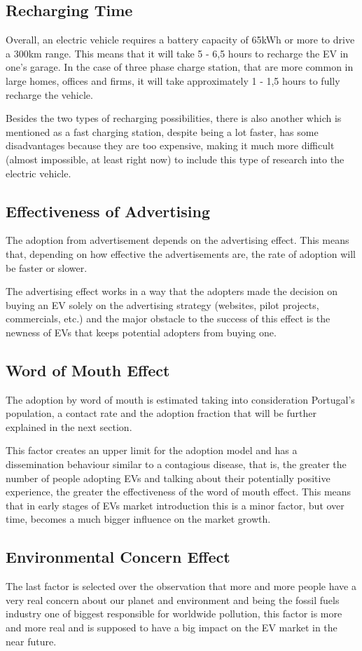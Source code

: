 \subsection{Recharging Time}
Overall, an electric vehicle requires a battery capacity of 65kWh or more to drive a 300km range. This means that it will take 5 - 6,5 hours to recharge the EV in one's garage. In the case of three phase charge station, that are more common in large homes, offices and firms, it will take approximately 1 - 1,5 hours to fully recharge the vehicle.

Besides the two types of recharging possibilities, there is also another which is mentioned as a fast charging station, despite being a lot faster, has some disadvantages because they are too expensive, making it much more difficult (almost impossible, at least right now) to include this type of research into the electric vehicle.

\subsection{Effectiveness of Advertising}
The adoption from advertisement depends on the advertising effect. This means that, depending on how effective the advertisements are, the rate of adoption will be faster or slower.

The advertising effect works in a way that the adopters made the decision on buying an EV solely on the advertising strategy (websites, pilot projects, commercials, etc.) and the major obstacle to the success of this effect is the newness of EVs that keeps potential adopters from buying one.

\subsection{Word of Mouth Effect}
The adoption by word of mouth is estimated taking into consideration Portugal's population, a contact rate and the adoption fraction that will be further explained in the next section.

This factor creates an upper limit for the adoption model and has a dissemination behaviour similar to a contagious disease, that is, the greater the number of people adopting EVs and talking about their potentially positive experience, the greater the effectiveness of the word of mouth effect. This means that in early stages of EVs market introduction this is a minor factor, but over time, becomes a much bigger influence on the market growth.

\subsection{Environmental Concern Effect}
The last factor is selected over the observation that more and more people have a very real concern about our planet and environment and being the fossil fuels industry one of biggest responsible for worldwide pollution, this factor is more and more real and is supposed to have a big impact on the EV market in the near future.

\clearpage